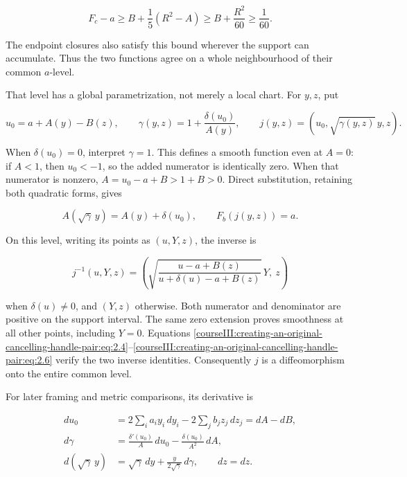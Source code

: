 \begin{equation}
F_c-a\geq B+\frac15(R^2-A)\geq B+\frac{R^2}{60}
          \geq \frac1{60}.
 \label{courseIII:creating-an-original-cancelling-handle-pair:eq:2.3}
\end{equation}

The endpoint closures also satisfy this bound wherever the support can accumulate. Thus the two functions agree on a whole neighbourhood of their common \(a\)-level.

That level has a global parametrization, not merely a local chart. For \(y,z\), put

\begin{equation}
u_0=a+A(y)-B(z),\qquad
 \gamma(y,z)=1+\frac{\delta(u_0)}{A(y)},\qquad
 j(y,z)=(u_0,\sqrt{\gamma(y,z)}\,y,z).
 \label{courseIII:creating-an-original-cancelling-handle-pair:eq:2.4}
\end{equation}

When \(\delta(u_0)=0\), interpret \(\gamma=1\). This defines a smooth function even at \(A=0\): if \(A<1\), then \(u_0<-1\), so the added numerator is identically zero. When that numerator is nonzero, \(A=u_0-a+B>1+B>0\). Direct substitution, retaining both quadratic forms, gives

\begin{equation}
A(\sqrt\gamma\,y)=A(y)+\delta(u_0),\qquad F_b(j(y,z))=a.
 \label{courseIII:creating-an-original-cancelling-handle-pair:eq:2.5}
\end{equation}

On this level, writing its points as \((u,Y,z)\), the inverse is

\begin{equation}
j^{-1}(u,Y,z)=
 \left(
 \sqrt{\frac{u-a+B(z)}{u+\delta(u)-a+B(z)}}\,Y,\ z
 \right)
 \label{courseIII:creating-an-original-cancelling-handle-pair:eq:2.6}
\end{equation}

when \(\delta(u)\ne0\), and \((Y,z)\) otherwise. Both numerator and denominator are positive on the support interval. The same zero extension proves smoothness at all other points, including \(Y=0\). Equations \eqref{courseIII:creating-an-original-cancelling-handle-pair:eq:2.4}--\eqref{courseIII:creating-an-original-cancelling-handle-pair:eq:2.6} verify the two inverse identities. Consequently \(j\) is a diffeomorphism onto the entire common level.

For later framing and metric comparisons, its derivative is

\begin{equation}
\begin{aligned}
 du_0&=2\sum_i a_i y_i\,dy_i-2\sum_j b_jz_j\,dz_j=dA-dB,\\
 d\gamma&=\frac{\delta'(u_0)}A\,du_0
                  -\frac{\delta(u_0)}{A^2}\,dA,\\
 d(\sqrt\gamma\,y)&=\sqrt\gamma\,dy+\frac{y}{2\sqrt\gamma}\,d\gamma,
 \qquad dz=dz.
\end{aligned}
 \label{courseIII:creating-an-original-cancelling-handle-pair:eq:2.7}
\end{equation}

